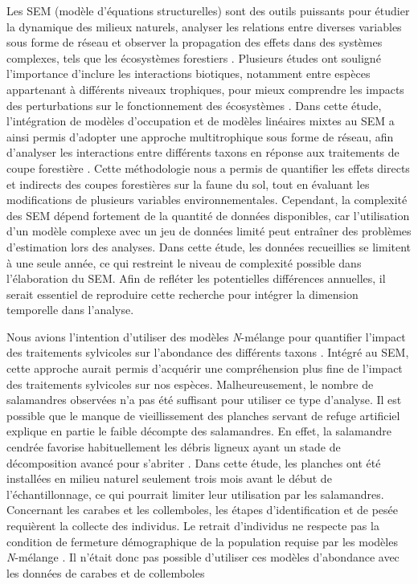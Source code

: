 Les SEM (modèle d’équations structurelles) sont des outils puissants pour étudier la dynamique des milieux naturels, analyser les relations entre diverses variables sous forme de réseau et observer la propagation des effets dans des systèmes complexes, 
tels que les écosystèmes forestiers \citep{graceSpecificationStructuralEquation2010}.  
Plusieurs études ont souligné l’importance d’inclure les interactions biotiques, notamment entre espèces appartenant à différents niveaux trophiques, pour mieux comprendre les impacts des perturbations 
sur le fonctionnement des écosystèmes \citep{Thebault2003Foodwebconstraints,Seibold2018necessitymultitrophic,Laigle2021Directindirect}.  
Dans cette étude, l’intégration de modèles d’occupation et de modèles linéaires mixtes au SEM a ainsi permis d’adopter une approche multitrophique sous forme de réseau, 
afin d’analyser les interactions entre différents taxons en réponse aux traitements de coupe forestière \citep{josephIntegratingOccupancyModels2016}.  
Cette méthodologie nous a permis de quantifier les effets directs et indirects des coupes forestières sur la faune du sol, tout en évaluant les modifications de plusieurs variables environnementales. 
Cependant, la complexité des SEM dépend fortement de la quantité de données disponibles, car l’utilisation d’un modèle complexe avec un jeu de données limité peut entraîner des problèmes d’estimation lors des analyses.  
Dans cette étude, les données recueillies se limitent à une seule année, ce qui restreint le niveau de complexité possible dans l'élaboration du SEM. 
Afin de refléter les potentielles différences annuelles, il serait essentiel de reproduire cette recherche pour intégrer la dimension temporelle dans l’analyse.

Nous avions l’intention d’utiliser des modèles \textit{N}-mélange pour quantifier l'impact des traitements sylvicoles sur l'abondance des différents taxons \citep{Royle2004Nmixturemodels,Mazerolle2021Woodlandsalamander}. 
Intégré au SEM, cette approche aurait permis d'acquérir une compréhension plus fine de l'impact des traitements sylvicoles sur nos espèces. 
Malheureusement, le nombre de salamandres observées n'a pas été suffisant pour utiliser ce type d'analyse. 
Il est possible que le manque de vieillissement des planches servant de refuge artificiel explique en partie le faible décompte des salamandres. 
En effet, la salamandre cendrée favorise habituellement les débris ligneux ayant un stade de décomposition avancé pour s'abriter \citep{Otto2011ComparingCover,hedrickEffectsCoverboardAge2021}. 
Dans cette étude, les planches ont été installées en milieu naturel seulement trois mois avant le début de l'échantillonnage, ce qui pourrait limiter leur utilisation par les salamandres. 
Concernant les carabes et les collemboles, les étapes d’identification et de pesée requièrent la collecte des individus. 
Le retrait d’individus ne respecte pas la condition de fermeture démographique de la population requise par les modèles \textit{N}-mélange \citep{Royle2004Nmixturemodels}. 
Il n’était donc pas possible d’utiliser ces modèles d’abondance avec les données de carabes et de collemboles

